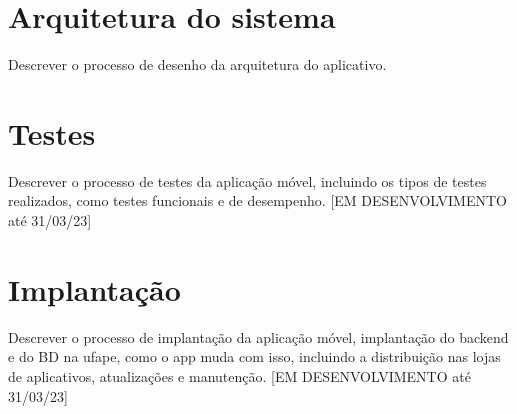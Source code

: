 \section{Arquitetura do sistema}\label{ssec:arquitetura}
Descrever o processo de desenho da arquitetura do aplicativo.


\section{Testes}
Descrever o processo de testes da aplicação móvel, incluindo os tipos de testes realizados, como testes funcionais e de desempenho.
[EM DESENVOLVIMENTO até 31/03/23]

\section{Implantação}
Descrever o processo de implantação da aplicação móvel, implantação do backend e do BD na ufape, como o app muda com isso, incluindo a distribuição nas lojas de aplicativos, atualizações e manutenção.
[EM DESENVOLVIMENTO até 31/03/23]



